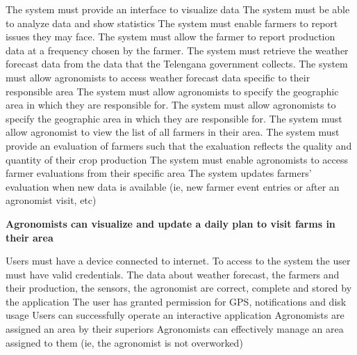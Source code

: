 \begin{itemize}
\begin{itemize}
 The system must provide an interface to visualize data
 The system must be able to analyze data and show statistics
 The system must enable farmers to report issues they may face.
 The system must allow the farmer to report production data at a frequency chosen by the farmer.
 The system must retrieve the weather forecast data from the data that the Telengana government collects.
 The system must allow agronomists to access weather forecast data specific to their responsible area
 The system must allow agronomists to specify the geographic area in which they are responsible for.
 The system must allow agronomists to specify the geographic area in which they are responsible for.
  The system must allow agronomist to view the list of all farmers in their area.
  The system must provide an evaluation of farmers such that the exaluation reflects the quality and quantity of their crop production
  The system must enable agronomists to access farmer evaluations from their specific area
  The system updates farmers' evaluation when new data is available (ie, new farmer event entries or after an agronomist visit, etc)
\end{itemize}

 \textbf{Agronomists can visualize and update a daily plan to visit farms in their area}
\begin{itemize}
  Users must have a device connected to internet.
 To access to the system the user must have valid credentials.
 The data about weather forecast, the farmers and their production, the sensors, the agronomist are correct, complete and stored by the application
 The user has granted permission for GPS, notifications and disk usage
 Users can successfully operate an interactive application
 Agronomists are assigned an area by their superiors
 Agronomists can effectively manage an area assigned to them (ie, the agronomist is not overworked)



\end{itemize}
\end{itemize}
